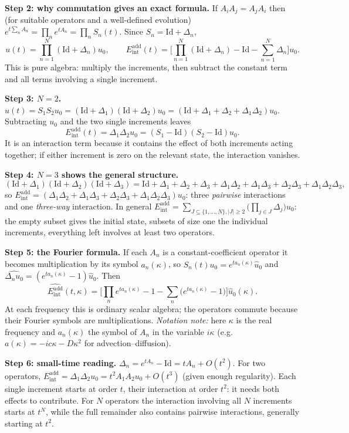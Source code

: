 \documentclass[11pt]{article}
\theoremstyle{plain}
\theoremstyle{definition}
\theoremstyle{remark}
\newcommand{\Id}{\mathrm{Id}}
\newcommand{\Eint}{E_{\mathrm{int}}}        %
\begin{document}
\medskip\textbf{Step 2: why commutation gives an exact formula.} If $A_iA_j=A_jA_i$ then (for suitable operators and a well-defined evolution) $e^{t\sum_nA_n}=\prod_ne^{tA_n}=\prod_nS_n(t)$. Since $S_n=\Id+\Delta_n$,
\[
u(t)=\prod_{n=1}^N(\Id+\Delta_n)u_0,\qquad
\Eint^{\mathrm{add}}(t)=\Big[\prod_{n=1}^N(\Id+\Delta_n)-\Id-\sum_{n=1}^N\Delta_n\Big]u_0 .
\]
This is pure algebra: multiply the increments, then subtract the constant term and all terms involving a single increment.

\medskip\textbf{Step 3: $N=2$.} $u(t)=S_1S_2u_0=(\Id+\Delta_1)(\Id+\Delta_2)u_0=(\Id+\Delta_1+\Delta_2+\Delta_1\Delta_2)u_0$. Subtracting $u_0$ and the two single increments leaves
\[
\Eint^{\mathrm{add}}(t)=\Delta_1\Delta_2u_0=(S_1-\Id)(S_2-\Id)u_0 .
\]
It is an interaction term because it contains the effect of both increments acting together; if either increment is zero on the relevant state, the interaction vanishes.

\medskip\textbf{Step 4: $N=3$ shows the general structure.}
\[
(\Id+\Delta_1)(\Id+\Delta_2)(\Id+\Delta_3)=\Id+\Delta_1+\Delta_2+\Delta_3+\Delta_1\Delta_2+\Delta_1\Delta_3+\Delta_2\Delta_3+\Delta_1\Delta_2\Delta_3,
\]
so $\Eint^{\mathrm{add}}=(\Delta_1\Delta_2+\Delta_1\Delta_3+\Delta_2\Delta_3+\Delta_1\Delta_2\Delta_3)u_0$: three \emph{pairwise} interactions and one \emph{three-way} interaction. In general $\Eint^{\mathrm{add}}=\sum_{J\subseteq\{1,\dots,N\},|J|\ge2}\big(\prod_{j\in J}\Delta_j\big)u_0$: the empty subset gives the initial state, subsets of size one the individual increments, everything left involves at least two operators.

\medskip\textbf{Step 5: the Fourier formula.} If each $A_n$ is a constant-coefficient operator it becomes multiplication by its symbol $a_n(\kappa)$, so $\widehat{S_n(t)u_0}=e^{ta_n(\kappa)}\hat u_0$ and $\widehat{\Delta_nu_0}=(e^{ta_n(\kappa)}-1)\hat u_0$. Then
\[
\widehat{\Eint^{\mathrm{add}}}(t,\kappa)=\Big[\prod_ne^{ta_n(\kappa)}-1-\sum_n\big(e^{ta_n(\kappa)}-1\big)\Big]\hat u_0(\kappa).
\]
At each frequency this is ordinary scalar algebra; the operators commute because their Fourier symbols are multiplications. \emph{Notation note:} here $\kappa$ is the real frequency and $a_n(\kappa)$ the symbol of $A_n$ in the variable $i\kappa$ (e.g.\ $a(\kappa)=-ic\kappa-D\kappa^2$ for advection--diffusion).

\medskip\textbf{Step 6: small-time reading.} $\Delta_n=e^{tA_n}-\Id=tA_n+O(t^2)$. For two operators, $\Eint^{\mathrm{add}}=\Delta_1\Delta_2u_0=t^2A_1A_2u_0+O(t^3)$ (given enough regularity). Each single increment starts at order $t$, their interaction at order $t^2$: it needs both effects to contribute. For $N$ operators the interaction involving all $N$ increments starts at $t^N$, while the full remainder also contains pairwise interactions, generally starting at $t^2$.
\end{document}
